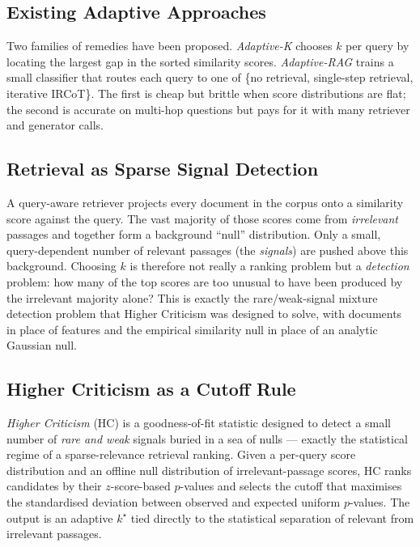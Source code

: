 \documentclass[letterpaper]{article}
\begin{document}
\subsection{Existing Adaptive Approaches}
Two families of remedies have been proposed. \emph{Adaptive-K}
\cite{adaptivek2025} chooses $k$ per query by locating the largest gap
in the sorted similarity scores. \emph{Adaptive-RAG}
\cite{jeong2024adaptiverag} trains a small classifier that routes each
query to one of \{no retrieval, single-step retrieval, iterative
IRCoT\}. The first is cheap but brittle when score distributions are
flat; the second is accurate on multi-hop questions but pays for it
with many retriever and generator calls.

\subsection{Retrieval as Sparse Signal Detection}
\label{sec:sparse}
A query-aware retriever projects every document in the corpus onto a
similarity score against the query. The vast majority of those scores
come from \emph{irrelevant} passages and together form a background
``null'' distribution. Only a small, query-dependent number of
relevant passages (the \emph{signals}) are pushed above this
background. Choosing $k$ is therefore not really a ranking problem
but a \emph{detection} problem: how many of the top scores are too
unusual to have been produced by the irrelevant majority alone? This
is exactly the rare/weak-signal mixture detection problem that Higher
Criticism was designed to solve, with documents in place of features
and the empirical similarity null in place of an analytic Gaussian
null.

\subsection{Higher Criticism as a Cutoff Rule}
\emph{Higher Criticism} (HC) \cite{donohojin2004hc} is a
goodness-of-fit statistic designed to detect a small number of
\emph{rare and weak} signals buried in a sea of nulls --- exactly the
statistical regime of a sparse-relevance retrieval ranking. Given a
per-query score distribution and an offline null
distribution of irrelevant-passage scores, HC ranks candidates by
their $z$-score-based $p$-values and selects the cutoff that maximises
the standardised deviation between observed and expected uniform
$p$-values. The output is an adaptive $k^\star$ tied directly to the
statistical separation of relevant from irrelevant passages.
\end{document}
